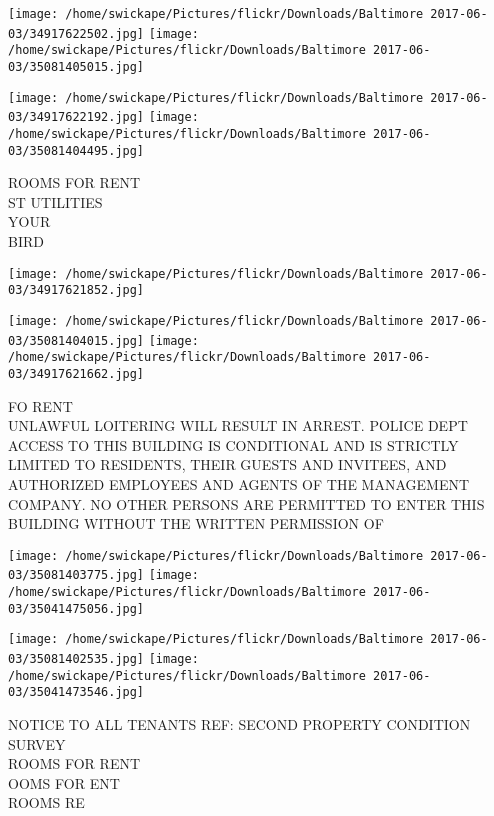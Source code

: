 \documentclass[10pt,letterpaper]{article}
\begin{document}
\texttt{[image: /home/swickape/Pictures/flickr/Downloads/Baltimore 2017-06-03/34917622502.jpg]}
\texttt{[image: /home/swickape/Pictures/flickr/Downloads/Baltimore 2017-06-03/35081405015.jpg]}

\texttt{[image: /home/swickape/Pictures/flickr/Downloads/Baltimore 2017-06-03/34917622192.jpg]}
\texttt{[image: /home/swickape/Pictures/flickr/Downloads/Baltimore 2017-06-03/35081404495.jpg]}

ROOMS FOR RENT\\
ST UTILITIES\\
YOUR\\
BIRD\\
\pagebreak

\texttt{[image: /home/swickape/Pictures/flickr/Downloads/Baltimore 2017-06-03/34917621852.jpg]}

\vspace{0.25in}
\texttt{[image: /home/swickape/Pictures/flickr/Downloads/Baltimore 2017-06-03/35081404015.jpg]}
\texttt{[image: /home/swickape/Pictures/flickr/Downloads/Baltimore 2017-06-03/34917621662.jpg]}

FO RENT\\
UNLAWFUL LOITERING WILL RESULT IN ARREST.  POLICE DEPT\\
ACCESS TO THIS BUILDING IS CONDITIONAL AND IS STRICTLY LIMITED TO RESIDENTS, THEIR GUESTS AND INVITEES, AND AUTHORIZED EMPLOYEES AND AGENTS OF THE MANAGEMENT COMPANY.  NO OTHER PERSONS ARE PERMITTED TO ENTER THIS BUILDING WITHOUT THE WRITTEN PERMISSION OF\\
\pagebreak

\texttt{[image: /home/swickape/Pictures/flickr/Downloads/Baltimore 2017-06-03/35081403775.jpg]}
\texttt{[image: /home/swickape/Pictures/flickr/Downloads/Baltimore 2017-06-03/35041475056.jpg]}

\texttt{[image: /home/swickape/Pictures/flickr/Downloads/Baltimore 2017-06-03/35081402535.jpg]}
\texttt{[image: /home/swickape/Pictures/flickr/Downloads/Baltimore 2017-06-03/35041473546.jpg]}

NOTICE TO ALL TENANTS REF: SECOND PROPERTY CONDITION SURVEY\\
ROOMS FOR RENT\\
OOMS FOR ENT\\
ROOMS RE\\
\pagebreak
\end{document}
